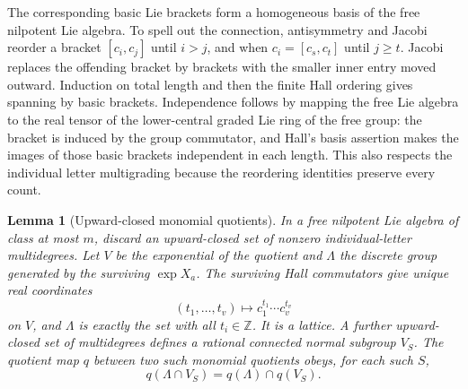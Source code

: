 \documentclass[11pt]{article}
\newtheorem{lemma}[theorem]{Lemma}
\newcommand{\Z}{\mathbb Z}\newcommand{\N}{\mathbb N}
\begin{document}
The corresponding basic Lie brackets form a homogeneous basis of the free
nilpotent Lie algebra. To spell out the connection, antisymmetry and Jacobi
reorder a bracket $[c_i,c_j]$ until $i>j$, and when
$c_i=[c_s,c_t]$ until $j\geq t$. Jacobi replaces the offending bracket by
brackets with the smaller inner entry moved outward. Induction on total
length and then the finite Hall ordering gives spanning by basic brackets.
Independence follows by mapping the free Lie algebra to the real tensor of
the lower-central graded Lie ring of the free group: the bracket is induced
by the group commutator, and Hall's basis assertion makes the images of those
basic brackets independent in each length. This also respects the individual
letter multigrading because the reordering identities preserve every count.

\begin{lemma}[Upward-closed monomial quotients]\label{lem:hall}
In a free nilpotent Lie algebra of class at most $m$, discard an upward-closed
set of nonzero individual-letter multidegrees. Let $V$ be the exponential
of the quotient and $\Lambda$ the discrete group generated by the surviving
$\exp X_a$. The surviving Hall commutators give unique real coordinates
\[
 (t_1,\ldots,t_v)\longmapsto c_1^{t_1}\cdots c_v^{t_v}
\]
on $V$, and $\Lambda$ is exactly the set with all $t_i\in\Z$.
It is a lattice. A further upward-closed set of multidegrees defines a
rational connected normal subgroup $V_S$. The quotient map $q$ between
two such monomial quotients obeys, for each such $S$,
\begin{equation}\label{eq:saturation}
 q(\Lambda\cap V_S)=q(\Lambda)\cap q(V_S).
\end{equation}
\end{lemma}
\end{document}
